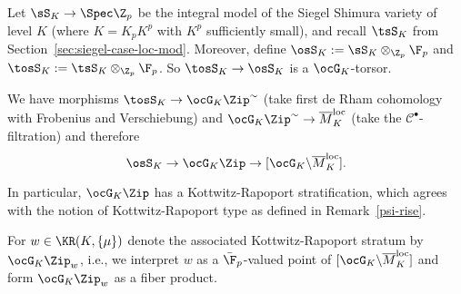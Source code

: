 \documentclass[a4paper]{scrartcl} %
\numberwithin{equation}{section}
\begin{document}
\begin{Notation}
  Let $\sS_K\to\Spec\Z_p$ be the integral model of the Siegel Shimura variety of level $K$ (where $K=K_pK^p$ with $K^p$ sufficiently small), and recall $\tsS_K$ from Section~\ref{sec:siegel-case-loc-mod}. Moreover, define $\osS_K:=\sS_K\otimes_{\Z_p}\F_p$ and $\tosS_K:=\tsS_K\otimes_{\Z_p}\F_p$. So $\tosS_K\to\osS_K$ is a $\ocG_K$-torsor.
\end{Notation}


\begin{Remark}
  We have morphisms $\tosS_K \to \ocG_K\Zip^{\sim}$ (take first de Rham cohomology with Frobenius and Verschiebung) and $\ocG_K\Zip^{\sim} \to \overline{M}^\mathrm{loc}_K$ (take the $\mathcal{C}^\bullet$-filtration) and therefore
  \begin{equation*}
    \osS_K \to \ocG_K\Zip \to [\ocG_K\backslash \overline{M}^\mathrm{loc}_K].
  \end{equation*}
\end{Remark}





\begin{Remark}
  In particular, $\ocG_K\Zip$ has a Kottwitz-Rapoport stratification, which agrees with the notion of Kottwitz-Rapoport type as defined in Remark~\ref{psi-rise}.

  For $w\in \KR(K,\{\mu\})$ denote the associated Kottwitz-Rapoport stratum by $\ocG_K\Zip_w$, i.e.,
  we interpret $w$ as a $\bar\F_p$-valued point of $[\ocG_K\backslash \overline{M}^\mathrm{loc}_K]$ and form $\ocG_K\Zip_w$ as a fiber product.
\end{Remark}
\end{document}
